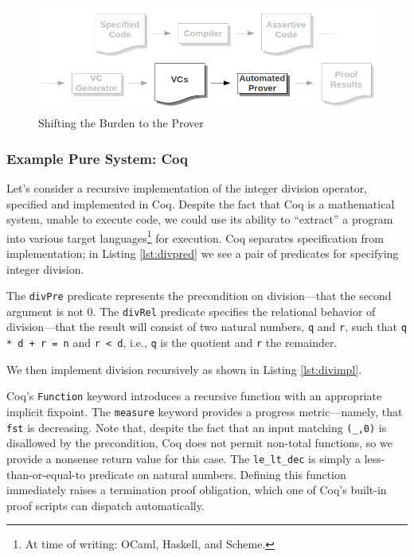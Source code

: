 \begin{figure}
  \centering
    \includegraphics[width=\textwidth]{proverpart}
  \caption{Shifting the Burden to the Prover\label{fig:prover}}
\end{figure}

\subsubsection{Example Pure System: Coq\label{sec:exPure}}
Let's consider a recursive implementation of the integer division operator, specified and implemented in Coq.  Despite the fact that Coq is a mathematical system, unable to execute code, we could use its ability to ``extract'' a program into various target languages\footnote{At time of writing: OCaml, Haskell, and Scheme.} for execution.  Coq separates specification from implementation; in Listing \ref{lst:divpred} we see a pair of predicates for specifying integer division.



The \texttt{divPre} predicate represents the precondition on division---that the second argument is not 0.  The \texttt{divRel} predicate specifies the relational behavior of division---that the result will consist of two natural numbers, \texttt{q} and \texttt{r}, such that \texttt{q * d + r = n} and \texttt{r < d}, i.e., \texttt{q} is the quotient and \texttt{r} the remainder.

We then implement division recursively as shown in Listing \ref{lst:divimpl}.



Coq's \texttt{Function} keyword introduces a recursive function with an appropriate implicit fixpoint.  The \texttt{measure} keyword provides a progress metric---namely, that \texttt{fst} is decreasing.  Note that, despite the fact that an input matching \texttt{(\_,0)} is disallowed by the precondition, Coq does not permit non-total functions, so we provide a nonsense return value for this case.  The \texttt{le\_lt\_dec} is simply a less-than-or-equal-to predicate on natural numbers. Defining this function immediately raises a termination proof obligation, which one of Coq's built-in proof scripts can dispatch automatically.

